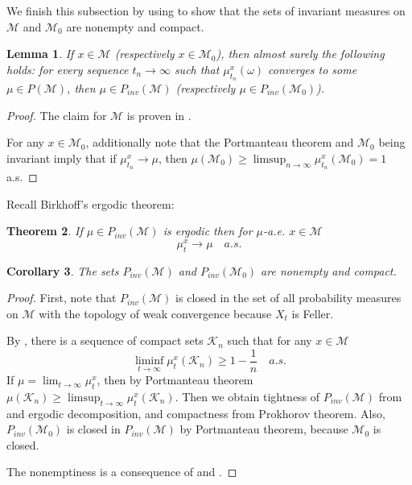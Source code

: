 \documentclass[final]{amsart}
\newtheorem{thm}{Theorem}
\newtheorem{lem}[thm]{Lemma}
\newtheorem{cor}[thm]{Corollary}
\numberwithin{thm}{section}
\numberwithin{equation}{section}
\newcommand{\mcM}{\mathcal{M}}
\newcommand{\K}{\mathcal{K}}
\begin{document}
We finish this subsection by using  to show that the sets of invariant measures on $\mcM$ and $\mcM_0$ are nonempty and compact. 

\begin{lem} \label{lim-is-inv}
   If $x \in \mcM$ (respectively $x \in \mcM_0$), then almost surely the following holds: for every sequence $t_n \to \infty$ such that $\mu_{t_n}^x(\omega)$ converges to some $\mu \in P(\mcM)$, then $\mu \in P_{inv}(\mcM)$ (respectively $\mu \in P_{inv}(\mcM_0)$).\end{lem}
   
   \begin{proof}
   The claim for $\mcM$ is proven  in \cite[Theorem 2.2ii]{persistence}.


For any $x \in \mcM_0$, additionally note that the Portmanteau theorem and $\mcM_0$ being invariant imply that if $\mu_{t_n}^x \to \mu$, then $\mu(\mcM_0) \geq \limsup_{n \to \infty} \mu_{t_n}^x(\mcM_0) = 1$ a.s.
\end{proof}



Recall Birkhoff's ergodic theorem:

\begin{thm}\label{Birk}
If $\mu \in P_{inv}(\mcM)$ is ergodic then for $\mu$-a.e. $x \in \mcM$ $$\mu_t^x \to \mu \quad a.s.$$
\end{thm}

\begin{cor}\label{pinv-compact}
    The sets $P_{inv}(\mcM)$ and $P_{inv}(\mcM_0)$ are nonempty and compact.
\end{cor}
\begin{proof}
First, note that $P_{inv}(\mcM)$ is closed in the set of all probability measures on $\mcM$ with the topology of weak convergence because $X_t$ is Feller.

    By , there is a sequence of compact sets $\K_n$ such that for any $x \in \mcM$ $$\liminf_{t \to \infty} \mu_t^x(\K_n) \geq 1 - \frac{1}{n} \quad a.s.$$
    If $\mu = \lim_{t \to \infty} \mu_t^x$, then by Portmanteau theorem $\mu(\K_n) \geq \limsup_{t \to \infty} \mu_t^x(\K_n)$. Then we obtain tightness of $P_{inv}(\mcM)$ from  and ergodic decomposition, and compactness from Prokhorov theorem. Also, $P_{inv}(\mcM_0)$ is closed in $P_{inv}(\mcM)$ by Portmanteau theorem, because $\mcM_0$ is closed.
    
    The nonemptiness is a consequence of  and .    \end{proof}
\end{document}
